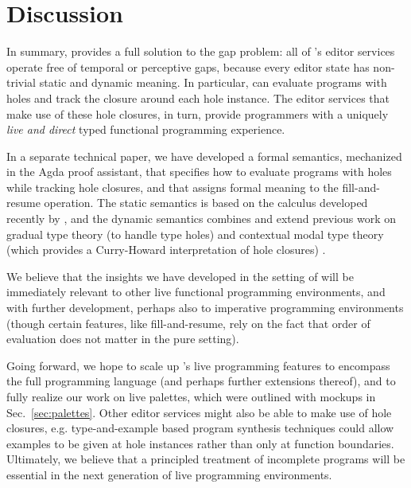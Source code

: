 \section{Discussion}
\label{sec:discussion}
In summary, \Hazel provides a full solution to the gap problem: all of \Hazel's
editor services operate free of temporal or perceptive gaps, because every editor state
has non-trivial static and dynamic meaning. In particular, \Hazel can evaluate programs with holes and track the closure around each hole instance. The editor services that make use of these hole closures, in turn, provide \Hazel programmers with a uniquely 
\emph{live and direct} typed functional programming experience. 

In a separate technical paper,
we have developed a formal semantics,
mechanized in the Agda proof assistant, that
specifies how to evaluate programs with holes while tracking hole closures, and that assigns formal meaning to the fill-and-resume operation. The static semantics is based on the \Hazelnut calculus developed recently by \citet{popl-paper}, and the dynamic semantics combines and extend previous work on gradual type theory (to handle type holes) \cite{Siek06a,DBLP:conf/snapl/SiekVCB15} and contextual modal type theory (which provides a Curry-Howard interpretation of hole closures) \cite{Nanevski2008}. 

We believe that the insights we have developed in the setting of 
\Hazel will be immediately relevant to other
live functional programming environments, and with further development,
perhaps also to imperative programming environments 
(though certain features, like fill-and-resume, rely on the fact
that order of evaluation does not matter in the pure 
setting). 

Going forward, we hope to scale up \Hazel's live programming features  to encompass the full \Elm{} programming language (and perhaps further extensions thereof), and to fully realize our work on live palettes, which were outlined with mockups in Sec.~\ref{sec:palettes}. 
Other editor services might also be able to make use of hole closures, e.g. type-and-example based program synthesis techniques \cite{Osera2015} could allow examples to be given at hole instances rather than only at function boundaries. 
Ultimately, we believe that a principled treatment of incomplete
programs will be essential in the next generation of live programming environments.
